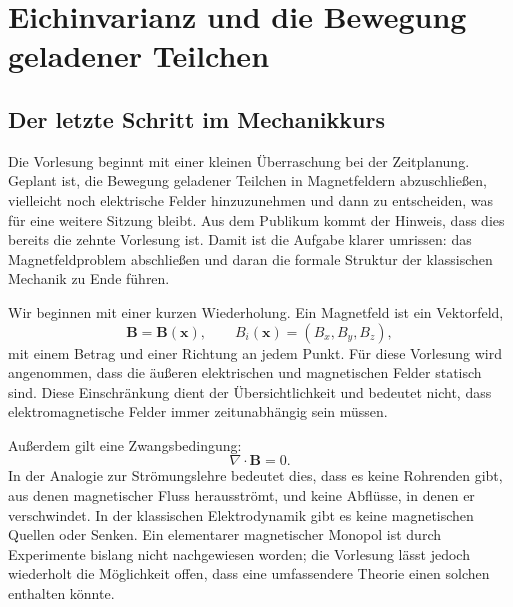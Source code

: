 \chapter{Eichinvarianz und die Bewegung geladener Teilchen}


\section{Der letzte Schritt im Mechanikkurs}

Die Vorlesung beginnt mit einer kleinen Überraschung bei der Zeitplanung. Geplant ist, die Bewegung geladener Teilchen in Magnetfeldern abzuschließen, vielleicht noch elektrische Felder hinzuzunehmen und dann zu entscheiden, was für eine weitere Sitzung bleibt. Aus dem Publikum kommt der Hinweis, dass dies bereits die zehnte Vorlesung ist. Damit ist die Aufgabe klarer umrissen: das Magnetfeldproblem abschließen und daran die formale Struktur der klassischen Mechanik zu Ende führen.

Wir beginnen mit einer kurzen Wiederholung. Ein Magnetfeld ist ein Vektorfeld,
\begin{equation}
  \mathbf B=\mathbf B(\mathbf x),
  \qquad
  B_i(\mathbf x)=(B_x,B_y,B_z),
\end{equation}
mit einem Betrag und einer Richtung an jedem Punkt. Für diese Vorlesung wird angenommen, dass die äußeren elektrischen und magnetischen Felder statisch sind. Diese Einschränkung dient der Übersichtlichkeit und bedeutet nicht, dass elektromagnetische Felder immer zeitunabhängig sein müssen.

Außerdem gilt eine Zwangsbedingung:
\begin{equation}
  \nabla\cdot\mathbf B=0.
\end{equation}
In der Analogie zur Strömungslehre bedeutet dies, dass es keine Rohrenden gibt, aus denen magnetischer Fluss herausströmt, und keine Abflüsse, in denen er verschwindet. In der klassischen Elektrodynamik gibt es keine magnetischen Quellen oder Senken. Ein elementarer magnetischer Monopol ist durch Experimente bislang nicht nachgewiesen worden; die Vorlesung lässt jedoch wiederholt die Möglichkeit offen, dass eine umfassendere Theorie einen solchen enthalten könnte.

